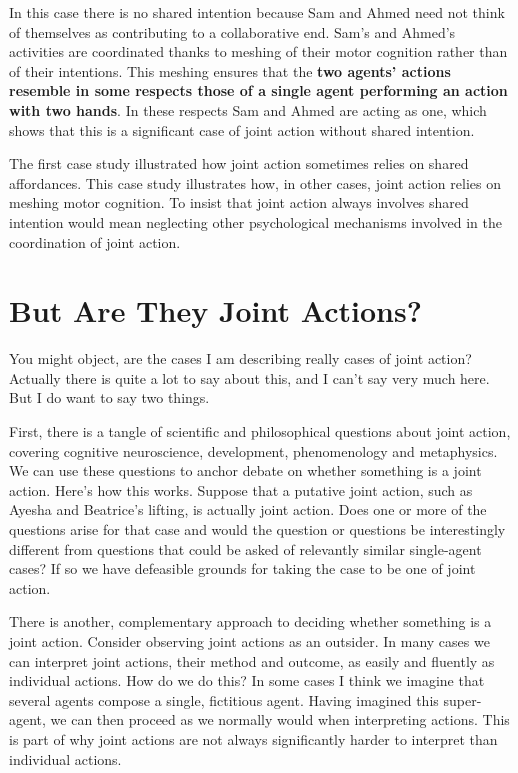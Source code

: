 \documentclass[12pt,a4paper]{extarticle}
\begin{document}
In this case there is no shared intention because Sam and Ahmed need not think of themselves as contributing to a collaborative end.  Sam's and Ahmed's activities are coordinated thanks to meshing of their motor cognition rather than of their intentions.  This meshing ensures that the \textbf{two agents' actions resemble in some respects those of a single agent performing an action with two hands}.  In these respects Sam and Ahmed are acting as one, which shows that this is a significant case of joint action without shared intention.  

The first case study illustrated how joint action sometimes relies on shared affordances.  This case study illustrates how, in other cases, joint action relies on meshing motor cognition.  To insist that joint action always involves shared intention would mean neglecting other psychological mechanisms involved in the coordination of joint action.


\section{But Are They Joint Actions?}
You might object, are the cases I am describing really cases of joint action?
Actually there is quite a lot to say about this, and I can't say very much here.  But I do want to say two things. 

First, there is a tangle of scientific and philosophical questions about joint action, covering cognitive neuroscience, development, phenomenology and metaphysics.  We can use these questions to anchor debate on whether something is a joint action.  Here's how this works.  Suppose that a putative joint action, such as Ayesha and Beatrice's lifting, is actually joint action.  Does one or more of the questions arise for that case and would the question or questions be interestingly different from questions that could be asked of relevantly similar single-agent cases?  If so we have defeasible grounds for taking the case to be one of joint action.

There is another, complementary approach to deciding whether something is a joint action.  Consider observing joint actions as an outsider.  In many cases we can interpret joint actions, their method and outcome, as easily and fluently as individual actions.  
How do we do this?
In some cases I think we imagine that several agents compose a single, fictitious agent. 
Having imagined this super-agent, we can then proceed as we normally would when interpreting actions.
This is part of why joint actions are not always significantly harder to interpret than individual actions.
\end{document}

